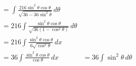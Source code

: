 \documentclass[preview]{standalone}
\begin{document}
\begin{align*}
&=\int \frac{216\sin^2\theta\cos\theta}{\sqrt{36-36\sin^2\theta}} \, d\theta \\&=216 \int \frac{\sin^2\theta\cos\theta}{\sqrt{36(1-\cos^2\theta)}} \, d\theta \\&=216 \int \frac{\sin^2\theta\cos\theta}{6\sqrt{\cos^2\theta}} \, dx \\&=36 \int \frac{\sin^2\theta\cos\theta}{\cos\theta} \, dx&=36 \int \sin^2\theta \, d\theta
\end{align*}
\end{document}
